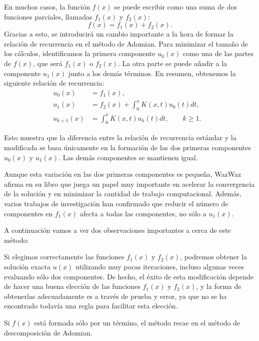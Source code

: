 En muchos casos, la función $f(x)$ se puede escribir como una suma de dos funciones parciales, llamadas $f_1(x)$ y $f_2(x)$:
\begin{equation}
	f(x) = f_1(x) + f_2(x).
\end{equation}
Gracias a esto, se introducirá un cambio importante a la hora de formar la relación de recurrencia en el método de Adomian. Para minimizar el tamaño de los cálculos, identificamos la primera componente $u_0(x)$ como una de las partes de $f(x)$, que será $f_1(x)$ o $f_2(x)$. La otra parte se puede añadir a la componente $u_1(x)$ junto a los demás términos. En resumen, obtenemos la siguiente relación de recurrencia:
\begin{align}
	u_0(x) &= f_1(x),      &   \\
	u_{1}(x) &= f_2(x) + \int_{0}^{x} K(x,t)u_0(t)dt,    &  \\
	u_{k+1}(x) &= \int_{0}^{x} K(x,t)u_k(t)dt, \qquad k \geqslant 1.    &
\end{align}	
\begin{observacion}
	Esto muestra que la diferencia entre la relación de recurrencia estándar y la modificada se basa únicamente en la formación de las dos primeras componentes $u_0(x)$ y $u_1(x)$. Las demás componentes se mantienen igual.
\end{observacion}
Aunque esta variación en las dos primeras componentes es pequeña, WazWaz afirma en su libro \cite{WazWaz} que juega un papel muy importante en acelerar la convergencia de la solución y en minimizar la cantidad de trabajo computacional. Además, varios trabajos de investigación han confirmado que reducir el número de componentes en $f_1(x)$ afecta a todas las componentes, no sólo a $u_1(x)$.

A continuación vamos a ver dos observaciones importantes a cerca de este método:
\begin{observacion}
	Si elegimos correctamente las funciones $f_1(x)$ y $f_2(x)$, podremos obtener la solución exacta $u(x)$ utilizando muy pocas iteraciones, incluso algunas veces evaluando sólo dos componentes. De hecho, el éxito de esta modificación depende de hacer una buena elección de las funciones $f_1(x)$ y $f_2(x)$, y la forma de obtenerlas adecuadamente es a través de prueba y error, ya que no se ha encontrado todavía una regla para facilitar esta elección.
\end{observacion}

\begin{observacion}
	Si $f(x)$ está formada sólo por un término, el método recae en el método de descomposición de Adomian.
\end{observacion}

